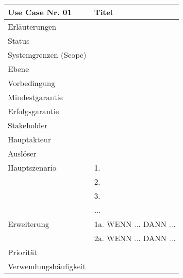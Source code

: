 \begin{tabularx}{\linewidth}{|l|X|}
	\hline
	Use Case Nr. 01			& \textbf{Titel} \\ \hline
	Erläuterungen			&  \\ \hline
	Status					&  \\ \hline
	Systemgrenzen (Scope)	&  \\ \hline
	Ebene					&  \\ \hline
	Vorbedingung			&  \\ \hline
	Mindestgarantie			&  \\ \hline
	Erfolgsgarantie			&  \\ \hline
	Stakeholder				&  \\ \hline
	Hauptakteur				&  \\ \hline
	Auslöser				&  \\ \hline	
	Hauptszenario			&  1. \\
							& 2. \\
							& 3.\\
							& ... \\ \hline
	Erweiterung				& 1a. WENN ... DANN ... \\ 
							& 2a. WENN ... DANN ... \\ \hline
	Priorität				&  \\ \hline
	Verwendungshäufigkeit	&  \\ \hline
\end{tabularx}
